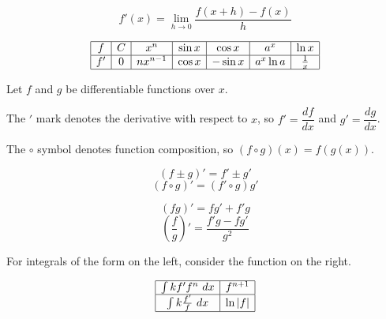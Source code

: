 \documentclass[../main.tex]{subfile}
\begin{document}


\begin{center}
\vspace{-2.8em}\large
$$f'(x) = \lim_{h \to 0} \frac{f(x + h) - f(x)}{h}$$
\normalsize
\end{center}

{\large\renewcommand{\arraystretch}{1.5}
$$\begin{array}{|*{7}{c|}}
	\hline
	f & C & x^n & \sin x & \cos x & a^x & \ln x \\
	\hline
	f' & 0 & nx^{n-1} & \cos x & -\sin x & a^x\ln a & \frac{1}{x} \\
	\hline
\end{array}$$
}


\vspace{-0.8em}
\begin{center}
Let $f$ and $g$ be differentiable functions over $x$.

The $'$ mark denotes the derivative with respect to $x$, so $f' = \dfrac{df}{dx}$ and $g' = \dfrac{dg}{dx}$.

The $\circ$ symbol denotes function composition, so $(f \circ g)(x) = f(g(x))$.
\end{center}
\vspace{0.5em}

\begin{figure}[h]
{\centering\large
\begin{minipage}{0.49\linewidth}
	$$(f \pm g)' = f' \pm g'$$
	\vspace{0.5em}
	$$(f \circ g)' = (f' \circ g) g'$$
\end{minipage}\hfill
\begin{minipage}{0.49\linewidth}
	$$(fg)' = fg' + f'g$$
	\vspace{0.5em}
	$$\left(\frac{f}{g}\right)' = \frac{f'g - fg'}{g^2}$$
\end{minipage}
}
\end{figure}


\begin{center}
For integrals of the form on the left, consider the function on the right.
\end{center}
\vspace{-1em}

{\large\renewcommand{\arraystretch}{1.8}
$$\begin{array}{|c|c|}
	\hline
	\int k f' f^n \ d x & f^{n + 1} \\
	\hline
	\int k \frac{f'}{f} \ d x & \ln|f| \\
	\hline
\end{array}$$}
\end{document}

